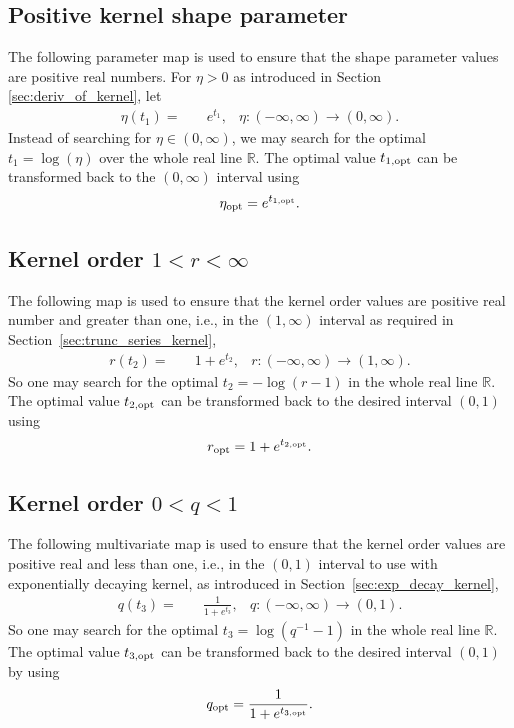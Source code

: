 \documentclass{svjour3}                     %
\newcommand{\reals}{\mathbb{R}}
\newcommand\secref{Section~\ref}
\begin{document}
\subsection{Positive kernel shape parameter}
The following parameter map is used to ensure that the shape parameter values are positive real numbers. For $\eta > 0$ as introduced in Section \ref{sec:deriv_of_kernel}, let
\begin{align*}
\eta{(t_1)} = & \quad e^{t_1}, & \eta : (-\infty, \infty) \to (0, \infty).
\end{align*}
Instead of searching for $\eta \in (0, \infty)$, we may search for the optimal $t_1 = \log(\eta)$ over the whole real line $\reals$. 
The optimal value $t_{1, \textup{opt}}$ can be transformed back to the $(0, \infty)$ interval using 
\begin{align*}
\eta_{\textup{opt}} = e^{t_{1,\textup{opt}}}.
\end{align*}



\subsection{Kernel order $1 < r < \infty$}
The following map is used to ensure that the kernel order values are positive real number and greater than one, i.e., in the $(1, \infty)$ interval as required in \secref{sec:trunc_series_kernel},
\begin{align*}
r(t_2) = & \quad {1 + e^{t_2}}, & r:  (-\infty, \infty) \to (1,\infty).
\end{align*}
So one may search for the optimal $t_2 = -\log(r-1)$ in the whole real line $\reals$.
The optimal value $t_{2, \textup{opt}}$ can be transformed back to the desired interval $(0,1)$ using 
\begin{align*}
r_{\textup{opt}} = 1+ e^{t_{2, \textup{opt}}}.
\end{align*}





\subsection{Kernel order $0 < q < 1$}
The following multivariate map is used to ensure that the kernel order values are positive real and less than one, i.e., in the $(0,1)$ interval to use with exponentially decaying kernel, as introduced in \secref{sec:exp_decay_kernel},
\begin{align*}
q(t_3) = & \quad \frac{1}{1 + e^{t_3}}, & q: (-\infty, \infty) \to (0, 1).
\end{align*}
So one may search for the optimal $t_3 = \log(q^{-1}-1)$ in the whole real line $\reals$.
The optimal value $t_{3, \textup{opt}}$ can be transformed back to the desired interval $(0,1)$ by using
\begin{align*}
q_{\textup{opt}} = \frac{1}{1 + e^{t_{3, \textup{opt}}}}.
\end{align*}
\end{document}
